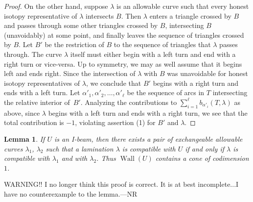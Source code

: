 \documentclass{amsart}
\newtheorem{lemma}[proposition]{Lemma}
\theoremstyle{definition}
\theoremstyle{remark}
\numberwithin{equation}{section}
\newcommand{\margincolor}{red}
\newcommand{\marginauthorcolor}{darkgreen}
\newcounter{margincounter}
\newcommand{\marginnum}{
\ifnum\value{margincounter}<10
\textcolor{\margincolor}{\begin{picture}(0,0)\put(2.2,2.4){\circle{9}}\end{picture}\footnotesize\arabic{margincounter}}
\else\ifnum\value{margincounter}<100
\textcolor{\margincolor}{\begin{picture}(0,0)\put(4.256,2.5){\circle{11}}\end{picture}\footnotesize\arabic{margincounter}}
\else
\textcolor{\margincolor}{\begin{picture}(0,0)\put(6.8,2.5){\circle{14}}\end{picture}\footnotesize\arabic{margincounter}}
\fi\fi
}
\newcommand{\margin}[2][]
{\!\!\refstepcounter{margincounter}\marginnum\marginpar{\textcolor{\margincolor}{\arabic{margincounter}.}\,\,\tiny #2\,\,\,\textcolor{\marginauthorcolor}{\small#1}}}
\newcommand{\marginN}[1]{\margin[NR]{#1}}
\newcommand{\0}{{\mathbf{0}}}
\newcommand{\Wall}{\operatorname{Wall}}
\begin{document}
\begin{proof}
On the other hand, suppose $\lambda$ is an allowable curve such that every honest isotopy representative of $\lambda$ intersects $B$.
Then $\lambda$ enters a triangle crossed by $B$ and passes through some other triangles crossed by $B$, intersecting $B$ (unavoidably) at some point, and finally leaves the sequence of triangles crossed by $B$.
Let $B'$ be the restriction of $B$ to the sequence of triangles that $\lambda$ passes through. 
The curve $\lambda$ itself must either begin with a left turn and end with a right turn or vice-versa. 
Up to symmetry, we may as well assume that it begins left and ends right.
Since the intersection of $\lambda$ with $B$ was unavoidable for honest isotopy representatives of $\lambda$, we conclude that $B'$ begins with a right turn and ends with a left turn.
Let $\alpha'_1, \alpha'_2,\ldots,\alpha'_\ell$ be the sequence of arcs in $T$ intersecting the relative interior of~$B'$.
Analyzing the contributions to $\sum_{i=1}^\ell b_{\alpha'_i}(T,\lambda)$ as above, since $\lambda$ begins with a left turn and ends with a right turn, we see that the total contribution is $-1$, violating assertion (1) for $B'$ and $\lambda$.
\end{proof}


\begin{lemma}\label{I-beam codim lemma}
If $U$ is an I-beam, then there exists a pair of exchangeable allowable curves $\lambda_1$, $\lambda_2$ such that a lamination $\lambda$ is compatible with $U$ if and only if $\lambda$ is compatible with $\lambda_1$ and with $\lambda_2$.
Thus $\Wall(U)$ contains a cone of codimension $1$.
\end{lemma}


WARNING!!  I no longer think this proof is correct.
It is at best incomplete...I have no counterexample to the lemma.---NR
\end{document}
